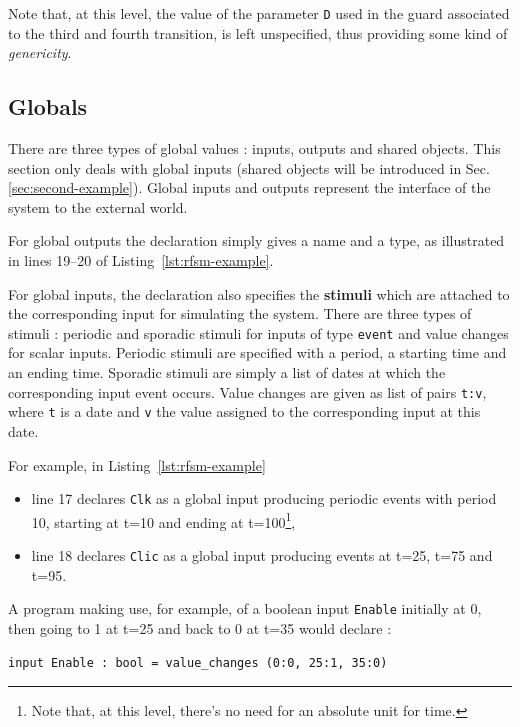 \medskip
Note that, at this level, the value of the parameter \verb|D| used in the guard associated to the
third and fourth transition, is left unspecified, thus providing some kind of \emph{genericity}. 

\subsection*{Globals}
\label{sec:globals}

There are three types of global values : inputs, outputs and shared objects. This section only deals
with global inputs (shared objects will be introduced in Sec.\ref{sec:second-example}). Global inputs  and
outputs represent the interface of the system to the external world. 

\medskip
For global outputs the declaration simply gives a name and a type, as illustrated in lines 19--20 of
Listing~\ref{lst:rfsm-example}. 

\medskip
For global inputs, the declaration also specifies the \textbf{stimuli} which are attached to the
corresponding input for simulating the system. There are three types of stimuli : periodic and
sporadic stimuli for inputs of type \verb|event| and value changes for scalar inputs.
Periodic stimuli are specified with a period, a starting time and an ending time. Sporadic stimuli
are simply a list of dates at which the corresponding input event occurs. Value changes are given as
list of pairs \verb|t:v|, where \verb|t| is a date and \verb|v| the value assigned to the
corresponding input at this date. 

\medskip
For example, in Listing~\ref{lst:rfsm-example}
\begin{itemize}
\item line 17 declares \verb|Clk| as a global input producing periodic events with period 10, starting
  at t=10 and ending at t=100\footnote{Note that, at this level, there's no need for an absolute
    unit for time.},
\item line 18 declares \verb|Clic| as a global input producing events at t=25, t=75 and
  t=95.
\end{itemize}

\medskip
A program making use, for example, of a boolean input \verb|Enable| initially at 0, then going to 1 at t=25 and
back to 0 at t=35 would declare :

\begin{lstlisting}[language=Rfsm,frame=single]
input Enable : bool = value_changes (0:0, 25:1, 35:0)
\end{lstlisting}

